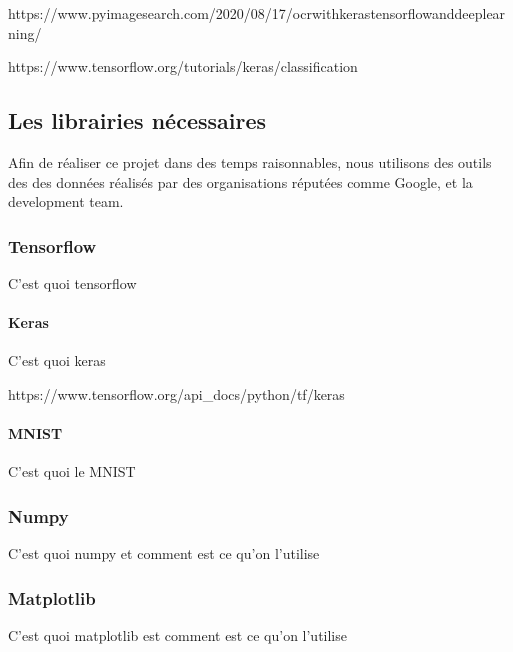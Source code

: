 \documentclass[letterpaper,10pt,french]{sphinxmanual}
\begin{document}
https://www.pyimagesearch.com/2020/08/17/ocr\sphinxhyphen{}with\sphinxhyphen{}keras\sphinxhyphen{}tensorflow\sphinxhyphen{}and\sphinxhyphen{}deep\sphinxhyphen{}learning/

https://www.tensorflow.org/tutorials/keras/classification


\subsection{Les librairies nécessaires}
\label{\detokenize{OCR_SAM:les-librairies-necessaires}}
Afin de réaliser ce projet dans des temps raisonnables, nous utilisons des
outils des des données réalisés par des organisations réputées comme Google,
 et la 
development team.


\subsubsection{Tensorflow}
\label{\detokenize{OCR_SAM:tensorflow}}
C’est quoi tensorflow


\paragraph{Keras}
\label{\detokenize{OCR_SAM:keras}}
C’est quoi keras

https://www.tensorflow.org/api\_docs/python/tf/keras


\paragraph{MNIST}
\label{\detokenize{OCR_SAM:mnist}}
C’est quoi le MNIST


\subsubsection{Numpy}
\label{\detokenize{OCR_SAM:numpy}}
C’est quoi numpy et comment est ce qu’on l’utilise


\subsubsection{Matplotlib}
\label{\detokenize{OCR_SAM:matplotlib}}
C’est quoi matplotlib est comment est ce qu’on l’utilise

\begin{sphinxVerbatim}[commandchars=\\\{\}]
   
   
   

   
   

\end{sphinxVerbatim}
\end{document}
